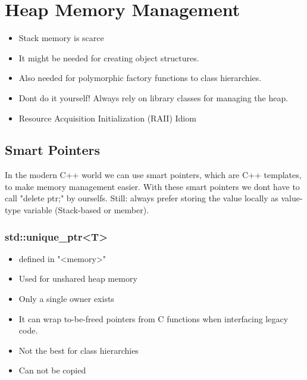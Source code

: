\section{Heap Memory Management}
\begin{itemize}
  \itemsep -0.5em 
  \item Stack memory is scarce
  \item It might be needed for creating object structures.
  \item Also needed for polymorphic factory functions to class hierarchies.
  \item Dont do it yourself! Always rely on library classes for managing the heap.
  \item Resource Acquisition Initialization (RAII) Idiom
\end{itemize}

\subsection{Smart Pointers}
In the modern C++ world we can use smart pointers, which are C++ templates, to make memory management easier. With these smart pointers we dont have to call "delete ptr;" by ourselfs. Still: always prefer storing the value locally as value-type variable (Stack-based or member).

\subsubsection{std::unique\_ptr<T>}
\begin{itemize}
  \itemsep -0.5em 
  \item defined in "<memory>"
  \item Used for unshared heap memory
  \item Only a single owner exists
  \item It can wrap to-be-freed pointers from C functions when interfacing legacy code.
  \item Not the best for class hierarchies
  \item Can not be copied
\end{itemize}


